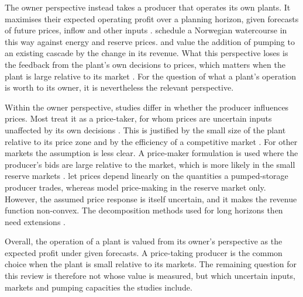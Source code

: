 The owner perspective instead takes a producer that operates its own plants.
It maximises their expected operating profit over a planning horizon, given
forecasts of future prices, inflow and other inputs
\citep{helseth2023hydropower}.
\citet{helseth2016} schedule a Norwegian watercourse in this way against
energy and reserve prices. \citet{ak2019quantifying} and
\citet{alic2023optimal} value the addition of pumping to an existing cascade
by the change in its revenue.
What this perspective loses is the feedback from the plant's own decisions
to prices, which matters when the plant is large relative to its market
\citep{henden2016economic}.
For the question of what a plant's operation is worth to its owner, it is
nevertheless the relevant perspective.

Within the owner perspective, studies differ in whether the producer
influences prices. Most treat it as a price-taker, for whom prices are
uncertain inputs unaffected by its own decisions
\citep{helseth2016,ak2019quantifying,bore2026assessing}.
This is justified by the small size of the plant relative to its price zone
and by the efficiency of a competitive market \citep{helseth2023hydropower}.
For other markets the assumption is less clear. A price-maker formulation
is used where the producer's bids are large relative to the market, which
is more likely in the small reserve markets
\citep{perezdiaz2015trends,perezdiaz2020medium}.
\citet{abgottspon2013stochastic} let prices depend linearly on the quantities
a pumped-storage producer trades, whereas \citet{perezdiaz2020medium} model
price-making in the reserve market only.
However, the assumed price response is itself uncertain, and it makes the
revenue function non-convex. The decomposition methods used for long
horizons then need extensions \citep{fullnerRebennack2025}.

Overall, the operation of a plant is valued from its owner's perspective as
the expected profit under given forecasts. A price-taking producer is the
common choice when the plant is small relative to its markets. The remaining
question for this review is therefore not whose value is measured, but which
uncertain inputs, markets and pumping capacities the studies include.
